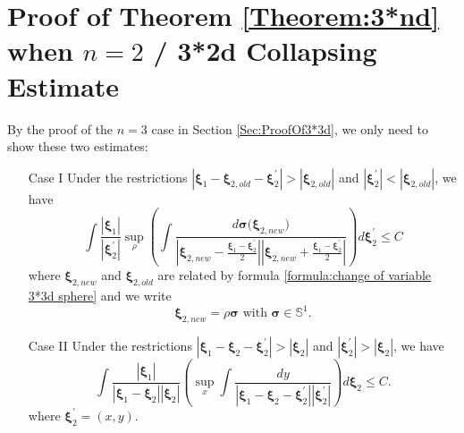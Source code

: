 \documentclass[reqno]{amsart}
\theoremstyle{plain}
\numberwithin{equation}{section}
\begin{document}
\section{Proof of Theorem \protect\ref{Theorem:3*nd} when $n=2$ / 3*2d
Collapsing Estimate \label{Sec:ProofOf3*2d}}

By the proof of the $n=3$ case in Section \ref{Sec:ProofOf3*3d}, we only
need to show these two estimates:

\begin{itemize}
\item[Case I] Under the restrictions $\left\vert \mathbf{\xi }_{1}-\mathbf{\xi }_{2,old}-\mathbf{\xi }_{2}^{\prime }\right\vert >\left\vert \mathbf{\xi 
}_{2,old}\right\vert $ and $\left\vert \mathbf{\xi }_{2}^{\prime
}\right\vert <\left\vert \mathbf{\xi }_{2,old}\right\vert $, we have\begin{equation*}
\int \frac{\left\vert \mathbf{\xi }_{1}\right\vert }{\left\vert \mathbf{\xi }_{2}^{\prime }\right\vert }\sup_{\rho }\left( \int \frac{d\mathbf{\sigma (\mathbf{\xi }}_{2,new}\mathbf{)}}{\left\vert \mathbf{\xi }_{2,new}-\frac{\mathbf{\xi }_{1}-\mathbf{\xi }_{2}^{\prime }}{2}\right\vert \left\vert 
\mathbf{\xi }_{2,new}+\frac{\mathbf{\xi }_{1}-\mathbf{\xi }_{2}^{\prime }}{2}\right\vert }\right) d\mathbf{\xi }_{2}^{\prime }\leqslant C
\end{equation*}where $\mathbf{\mathbf{\xi }}_{2,new}$ and $\mathbf{\xi }_{2,old}$ are
related by formula \ref{formula:change of variable 3*3d sphere} and we write 
\begin{equation*}
\mathbf{\mathbf{\xi }}_{2,new}\mathbf{=}\rho \mathbf{\sigma }\text{ with }\mathbf{\sigma }\in \mathbb{S}^{1}.
\end{equation*}

\item[Case II] Under the restrictions $\left\vert \mathbf{\xi }_{1}-\mathbf{\xi }_{2}-\mathbf{\xi }_{2}^{\prime }\right\vert >\left\vert \mathbf{\xi }_{2}\right\vert $ and $\left\vert \mathbf{\xi }_{2}^{\prime }\right\vert
>\left\vert \mathbf{\xi }_{2}\right\vert $, we have\begin{equation*}
\int \frac{\left\vert \mathbf{\xi }_{1}\right\vert }{\left\vert \mathbf{\xi }_{1}-\mathbf{\xi }_{2}\right\vert \left\vert \mathbf{\xi }_{2}\right\vert }\left( \sup_{x}\int \frac{dy}{\left\vert \mathbf{\xi }_{1}-\mathbf{\xi }_{2}-\mathbf{\xi }_{2}^{\prime }\right\vert \left\vert \mathbf{\xi }_{2}^{\prime
}\right\vert }\right) d\mathbf{\xi }_{2}\leqslant C.
\end{equation*}where $\mathbf{\xi }_{2}^{\prime }=(x,y).$
\end{itemize}
\end{document}
